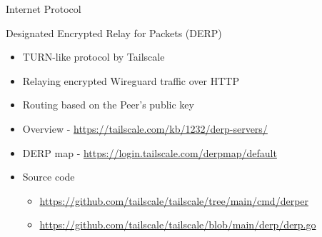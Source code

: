 \begin{block}{Internet Protocol}
\begin{block}{Designated Encrypted Relay for Packets (DERP)}
\protect\hypertarget{notes__02021-internet-protocol.md__designated-encrypted-relay-for-packets-derp}{}
\begin{itemize}
\item
  TURN-like protocol by Tailscale
\item
  Relaying encrypted Wireguard traffic over HTTP
\item
  Routing based on the Peer's public key
\item
  Overview - \url{https://tailscale.com/kb/1232/derp-servers/}
\item
  DERP map - \url{https://login.tailscale.com/derpmap/default}
\item
  Source code

  \begin{itemize}
  \item
    \url{https://github.com/tailscale/tailscale/tree/main/cmd/derper}
  \item
    \url{https://github.com/tailscale/tailscale/blob/main/derp/derp.go}
  \end{itemize}
\end{itemize}
\end{block}
\end{block}

